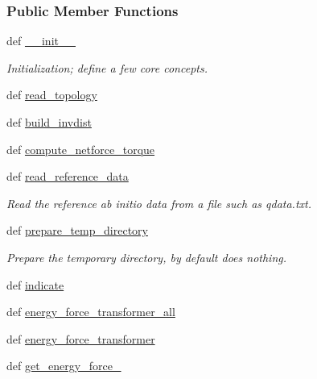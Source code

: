 \subsubsection*{Public Member Functions}
\begin{DoxyCompactItemize}
\item 
def \hyperlink{classforcebalance_1_1abinitio_1_1AbInitio_ad6d702694d6cd99e3432183e5c4860c9}{\-\_\-\-\_\-init\-\_\-\-\_\-}
\begin{DoxyCompactList}\small\item\em Initialization; define a few core concepts. \end{DoxyCompactList}\item 
def \hyperlink{classforcebalance_1_1abinitio_1_1AbInitio_a9f405c452a0a4081cd7da07938520920}{read\-\_\-topology}
\item 
def \hyperlink{classforcebalance_1_1abinitio_1_1AbInitio_a7475857193eefd4edd020d4f2a8fec17}{build\-\_\-invdist}
\item 
def \hyperlink{classforcebalance_1_1abinitio_1_1AbInitio_afbf86c26158a68cae7460b4106809fdd}{compute\-\_\-netforce\-\_\-torque}
\item 
def \hyperlink{classforcebalance_1_1abinitio_1_1AbInitio_aa73bedbf1e2cf19f2fa1e88815f1bd86}{read\-\_\-reference\-\_\-data}
\begin{DoxyCompactList}\small\item\em Read the reference ab initio data from a file such as qdata.\-txt. \end{DoxyCompactList}\item 
def \hyperlink{classforcebalance_1_1abinitio_1_1AbInitio_a2d0f465f1988fd6bc611f7de4b59fd04}{prepare\-\_\-temp\-\_\-directory}
\begin{DoxyCompactList}\small\item\em Prepare the temporary directory, by default does nothing. \end{DoxyCompactList}\item 
def \hyperlink{classforcebalance_1_1abinitio_1_1AbInitio_a3260db78e8c174f04a64661c4e5c181c}{indicate}
\item 
def \hyperlink{classforcebalance_1_1abinitio_1_1AbInitio_a3d28520925c6dfd179647d0abf7e1368}{energy\-\_\-force\-\_\-transformer\-\_\-all}
\item 
def \hyperlink{classforcebalance_1_1abinitio_1_1AbInitio_a9167da321a9fff748eef5ebe754cc7ca}{energy\-\_\-force\-\_\-transformer}
\item 
def \hyperlink{classforcebalance_1_1abinitio_1_1AbInitio_a313c848f46579817803c8a3ff100974e}{get\-\_\-energy\-\_\-force\-\_\-}

\end{DoxyCompactItemize}
